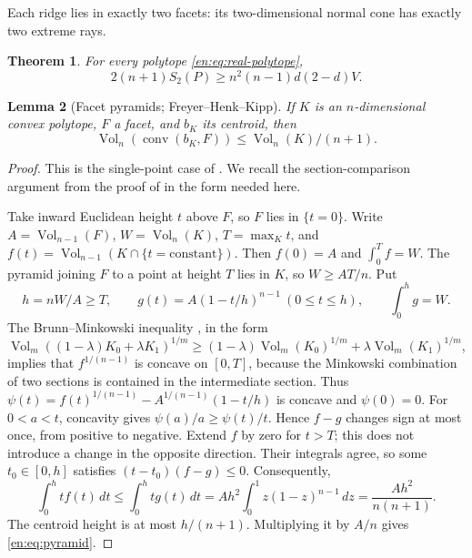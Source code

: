 \documentclass[12pt]{amsart}
\newtheorem{thm}{Theorem}[section]
\newtheorem{lem}[thm]{Lemma}
\theoremstyle{definition}
\theoremstyle{remark}
\numberwithin{equation}{section}
\theoremstyle{plain}
\theoremstyle{definition}
\theoremstyle{remark}
\begin{document}
Each ridge lies in exactly two facets: its two-dimensional normal cone has exactly two extreme rays.

\begin{thm}\label{en:thm:convex}
For every polytope \eqref{en:eq:real-polytope},
\begin{equation}\label{en:eq:convex-main}
 2(n+1)S_2(P)\ge n^2(n-1)d(2-d)V.
\end{equation}
\end{thm}

\begin{lem}[Facet pyramids; Freyer--Henk--Kipp]\label{en:lem:pyramid}
If $K$ is an $n$-dimensional convex polytope, $F$ a facet, and $b_K$ its centroid, then
\begin{equation}\label{en:eq:pyramid}
 \operatorname{Vol}_n(\operatorname{conv}(b_K,F))
 \le\operatorname{Vol}_n(K)/(n+1).
\end{equation}
\end{lem}
\begin{proof}
This is the single-point case of \cite[Theorem~1.1]{en:FHK}. We recall the section-comparison argument from the proof of \cite[Theorem~1.2(i)]{en:FHK} in the form needed here.

Take inward Euclidean height $t$ above $F$, so $F$ lies in $\{t=0\}$.
Write $A=\operatorname{Vol}_{n-1}(F)$, $W=\operatorname{Vol}_n(K)$,
$T=\max_Kt$, and $f(t)=\operatorname{Vol}_{n-1}(K\cap\{t=\text{constant}\})$.
Then $f(0)=A$ and $\int_0^T f=W$. The pyramid joining $F$ to a point at height $T$ lies in $K$, so $W\ge AT/n$. Put
\begin{equation}\label{en:eq:comparison}
 h=nW/A\ge T,\qquad
 g(t)=A(1-t/h)^{n-1}\ (0\le t\le h),\qquad
 \int_0^h g=W.
\end{equation}
The Brunn--Minkowski inequality \cite[Theorem~4.1]{en:Gardner}, in the form
$\operatorname{Vol}_m((1-\lambda)K_0+\lambda K_1)^{1/m}
\ge(1-\lambda)\operatorname{Vol}_m(K_0)^{1/m}
+\lambda\operatorname{Vol}_m(K_1)^{1/m}$,
implies that $f^{1/(n-1)}$ is concave on $[0,T]$, because the Minkowski combination of two sections is contained in the intermediate section. Thus
$\psi(t)=f(t)^{1/(n-1)}-A^{1/(n-1)}(1-t/h)$ is concave and $\psi(0)=0$.
For $0<a<t$, concavity gives $\psi(a)/a\ge\psi(t)/t$. Hence $f-g$ changes sign at most once, from positive to negative. Extend $f$ by zero for $t>T$; this does not introduce a change in the opposite direction. Their integrals agree, so some $t_0\in[0,h]$ satisfies
$(t-t_0)(f-g)\le0$. Consequently,
\begin{equation}\label{en:eq:moment}
 \int_0^h t f(t)\,dt
 \le\int_0^h t g(t)\,dt
 =Ah^2\int_0^1 z(1-z)^{n-1}\,dz
 =\frac{Ah^2}{n(n+1)}.
\end{equation}
The centroid height is at most $h/(n+1)$. Multiplying it by $A/n$ gives
\eqref{en:eq:pyramid}.
\end{proof}
\end{document}
